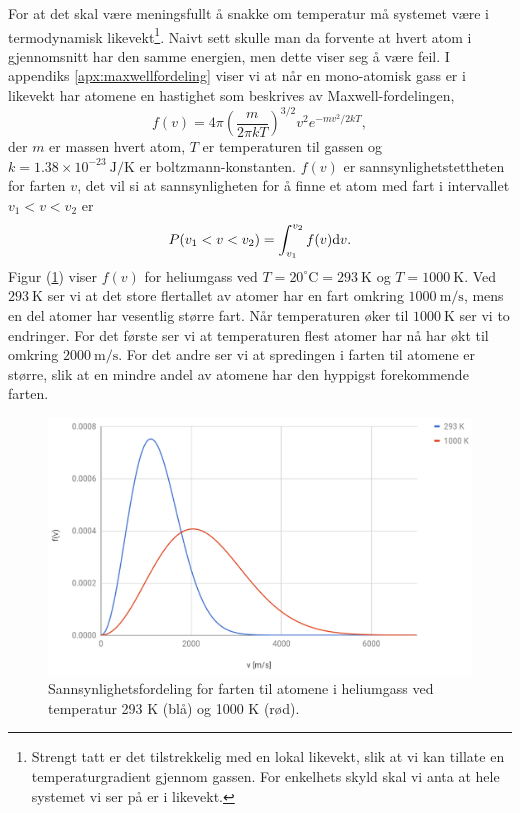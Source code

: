 For at det skal være meningsfullt å snakke om temperatur må systemet være i termodynamisk likevekt\footnote{Strengt tatt er det tilstrekkelig med en lokal likevekt, slik at vi kan tillate en temperaturgradient gjennom gassen. For enkelhets skyld skal vi anta at hele systemet vi ser på er i likevekt.}. Naivt sett skulle man da forvente at hvert atom i gjennomsnitt har den samme energien, men dette viser seg å være feil. I appendiks \ref{apx:maxwellfordeling} viser vi at når en mono-atomisk gass er i likevekt har atomene en hastighet som beskrives av Maxwell-fordelingen,
\begin{equation}
\label{eq:kinetiskgassteori:fv}	
	f(v) = 4\pi\left( \frac{m}{2\pi kT} \right)^{3/2} v^2e^{-mv^2/2kT},
\end{equation}
der $m$ er massen hvert atom, $T$ er temperaturen til gassen og $k = 1.38\times10^{-23}~\mathrm{J/K}$ er boltzmann-konstanten. $f(v)$ er sannsynlighetstettheten for farten $v$, det vil si at sannsynligheten for å finne et atom med fart i intervallet $v_1<v<v_2$ er
\begin{displaymath}
	P(v_1 < v < v_2) = \int_{v_1}^{v_2} f(v) \text{d} v.
\end{displaymath}
Figur (\ref{fig:kinetiskgassteori:Maxwelldist}) viser $f(v)$ for heliumgass ved $T=20^\circ\mathrm{C} = 293~\mathrm{K}$ og $T = 1000~\mathrm{K}$. Ved $293~\mathrm{K}$ ser vi at det store flertallet av atomer har en fart omkring $1000~\mathrm{m/s}$, mens en del atomer har vesentlig større fart. Når temperaturen øker til $1000~\mathrm{K}$ ser vi to endringer. For det første ser vi at temperaturen flest atomer har nå har økt til omkring $2000~\mathrm{m/s}$. For det andre ser vi at spredingen i farten til atomene er større, slik at en mindre andel av atomene har den hyppigst forekommende farten.

\begin{figure}[htp]
	\includegraphics{./MaxwellDistributionHelium}
	\caption{Sannsynlighetsfordeling for farten til atomene i heliumgass ved temperatur 293 K (blå) og 1000 K (rød).}
	\label{fig:kinetiskgassteori:Maxwelldist}
\end{figure}


